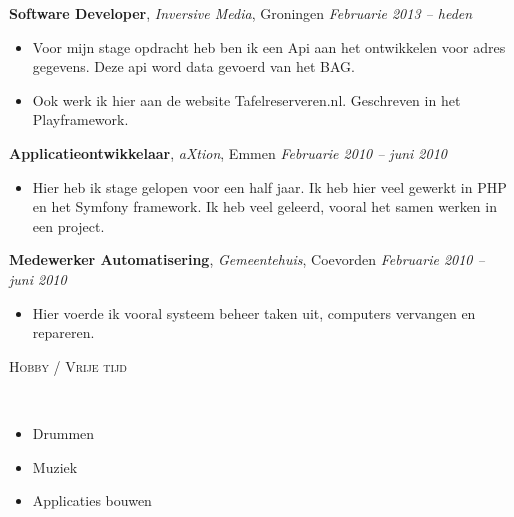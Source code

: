 \documentclass[9pt]{article}
\newenvironment{changemargin}[2]{%
  \begin{list}{}{%
    \setlength{\topsep}{0pt}%
    \setlength{\leftmargin}{#1}%
    \setlength{\rightmargin}{#2}%
    \setlength{\listparindent}{\parindent}%
    \setlength{\itemindent}{\parindent}%
    \setlength{\parsep}{\parskip}%
  }%
  \item[]}{\end{list}
}
\newcommand{\lineover}{
	\begin{changemargin}{-0.05in}{-0.05in}
		\vspace*{-8pt}
		\hrulefill \\
		\vspace*{-2pt}
	\end{changemargin}
}
\newcommand{\header}[1]{
	\begin{changemargin}{-0.5in}{-0.5in}
		\scshape{#1}\\
  	\lineover
	\end{changemargin}
}
\newenvironment{body} {
	\vspace*{-16pt}
	\begin{changemargin}{-0.25in}{-0.5in}
  }	
	{\end{changemargin}
}
\begin{document}
\begin{body}
	\vspace{14pt}
	\textbf{Software Developer}, \emph{Inversive Media}, Groningen \hfill \emph{Februarie 2013 -- heden}\\
	\vspace*{-4pt}
	\begin{itemize} \itemsep -0pt  %
		\item Voor mijn stage opdracht heb ben ik een Api aan het ontwikkelen voor adres gegevens. Deze api word data gevoerd van het BAG.
		\item Ook werk ik hier aan de website Tafelreserveren.nl. Geschreven in het Playframework.
	\end{itemize}

	\textbf {Applicatieontwikkelaar}, \emph{aXtion}, Emmen \hfill \emph{Februarie 2010 -- juni 2010}\\
	\vspace*{-4pt}
	\begin{itemize} \itemsep -0pt
		\item Hier heb ik stage gelopen voor  een half jaar. Ik heb hier veel gewerkt in PHP en het Symfony framework. Ik heb veel geleerd, vooral het samen werken in een project.
	\end{itemize}

	\textbf {Medewerker Automatisering}, \emph{Gemeentehuis}, Coevorden \hfill \emph{Februarie 2010 -- juni 2010}\\
	\vspace*{-4pt}
	\begin{itemize} \itemsep -0pt
		\item Hier voerde ik vooral systeem beheer taken uit, computers vervangen en repareren.  
	\end{itemize}
\end{body}

\smallskip


\header{Hobby / Vrije tijd}

\begin{body}
	\vspace{14pt}
	\begin{itemize} \itemsep -0pt  %
		\item Drummen
		\item Muziek
		\item Applicaties bouwen
	\end{itemize}

\end{body}

\smallskip


\smallskip
\end{document}

